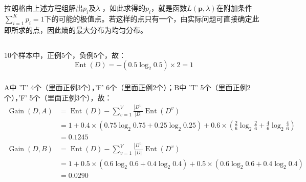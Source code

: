 \documentclass[UTF8,a4paper,AutoFakeBold,AutoFakeSlant]{article}
\begin{document}
拉朗格由上述方程组解出$p_i$及$\lambda$ ，如此求得的$p_i$，就是函数$L(\boldsymbol{p}, \lambda)$在附加条件
$ \sum_{i=1}^Kp_i=1 $下的可能的极值点。若这样的点只有一个，由实际问题可直接确定此即所求的点，因此熵的最大分布为均匀分布。



\subsection{}

\subsubsection{}
10个样本中，正例5个，负例5个，故：
\begin{equation*}
  \operatorname{Ent}(D) = -(0.5\log_2 0.5)\times2 = 1
\end{equation*}

\subsubsection{}
A中 'T' 4个（里面正例3个），'F' 6个（里面正例2个）；B中 'T' 5个（里面正例2个），'F' 5个（里面正例3个），故：
\begin{equation*}
  \begin{aligned}
    \operatorname{Gain}(D,A) & = \operatorname{Ent}(D)-\sum_{v=1}^{V} \frac{\left|D^{v}\right|}{|D|} \operatorname{Ent}\left(D^{v}\right)                   \\
                             & = 1 + 0.4\times(0.75\log_2 0.75 + 0.25\log_2 0.25) + 0.6\times(\frac{2}{6}\log_2 \frac{2}{6} + \frac{4}{6}\log_2\frac{4}{6}) \\
                             & = 0.1245
  \end{aligned}
\end{equation*}
\begin{equation*}
  \begin{aligned}
    \operatorname{Gain}(D,B) & = \operatorname{Ent}(D)-\sum_{v=1}^{V} \frac{\left|D^{v}\right|}{|D|} \operatorname{Ent}\left(D^{v}\right) \\
                             & = 1 + 0.5\times(0.6\log_2 0.6 + 0.4\log_2 0.4) + 0.5\times(0.6\log_2 0.6 + 0.4\log_2 0.4)                  \\
                             & = 0.0290
  \end{aligned}
\end{equation*}
\end{document}
